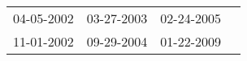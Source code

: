 \begin{supertabular}{llll}
 04-05-2002 &  03-27-2003 &  02-24-2005 \\
 11-01-2002 &  09-29-2004 &  01-22-2009 \\
\end{supertabular}
